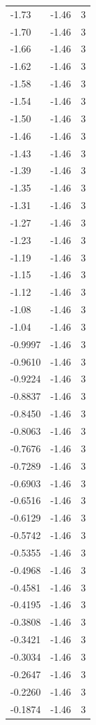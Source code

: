 \begin{longtable}{lrr}
  -1.73 & -1.46 & 3 \\
  -1.70 & -1.46 & 3 \\
  -1.66 & -1.46 & 3 \\
  -1.62 & -1.46 & 3 \\
  -1.58 & -1.46 & 3 \\
  -1.54 & -1.46 & 3 \\
  -1.50 & -1.46 & 3 \\
  -1.46 & -1.46 & 3 \\
  -1.43 & -1.46 & 3 \\
  -1.39 & -1.46 & 3 \\
  -1.35 & -1.46 & 3 \\
  -1.31 & -1.46 & 3 \\
  -1.27 & -1.46 & 3 \\
  -1.23 & -1.46 & 3 \\
  -1.19 & -1.46 & 3 \\
  -1.15 & -1.46 & 3 \\
  -1.12 & -1.46 & 3 \\
  -1.08 & -1.46 & 3 \\
  -1.04 & -1.46 & 3 \\
  -0.9997 & -1.46 & 3 \\
  -0.9610 & -1.46 & 3 \\
  -0.9224 & -1.46 & 3 \\
  -0.8837 & -1.46 & 3 \\
  -0.8450 & -1.46 & 3 \\
  -0.8063 & -1.46 & 3 \\
  -0.7676 & -1.46 & 3 \\
  -0.7289 & -1.46 & 3 \\
  -0.6903 & -1.46 & 3 \\
  -0.6516 & -1.46 & 3 \\
  -0.6129 & -1.46 & 3 \\
  -0.5742 & -1.46 & 3 \\
  -0.5355 & -1.46 & 3 \\
  -0.4968 & -1.46 & 3 \\
  -0.4581 & -1.46 & 3 \\
  -0.4195 & -1.46 & 3 \\
  -0.3808 & -1.46 & 3 \\
  -0.3421 & -1.46 & 3 \\
  -0.3034 & -1.46 & 3 \\
  -0.2647 & -1.46 & 3 \\
  -0.2260 & -1.46 & 3 \\
  -0.1874 & -1.46 & 3 \\

\end{longtable}
